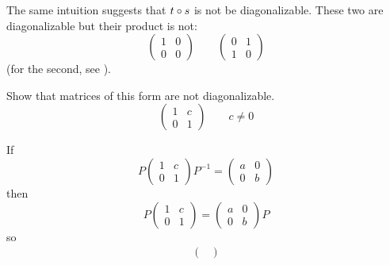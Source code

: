 \begin{exercises}
\begin{answer}
     The same intuition suggests that \( t\mathbin\circ s \) is not
     be diagonalizable.
     These two are diagonalizable but their product is not:
     \begin{equation*}
        \begin{pmatrix}
           1  &0  \\
           0  &0
        \end{pmatrix}
        \qquad
        \begin{pmatrix}
           0  &1  \\
           1  &0
        \end{pmatrix}
     \end{equation*}
     (for the second, see ).   
    \end{answer}
  \recommended \item 
    Show that matrices of this form are not diagonalizable.
    \begin{equation*}
       \begin{pmatrix}
          1  &c  \\
          0  &1
       \end{pmatrix}
       \qquad c\neq 0
    \end{equation*}
    \begin{answer}
      If
      \begin{equation*}
         P
         \begin{pmatrix}
            1  &c  \\
            0  &1
         \end{pmatrix}
         P^{-1}
         =
         \begin{pmatrix}
            a  &0  \\
            0  &b
         \end{pmatrix}
      \end{equation*}
      then
      \begin{equation*}
         P
         \begin{pmatrix}
            1  &c  \\
            0  &1
         \end{pmatrix}
         =
         \begin{pmatrix}
            a  &0  \\
            0  &b
         \end{pmatrix}
         P
      \end{equation*}
      so
      \begin{align*}
         \begin{pmatrix}

\end{pmatrix}
\end{align*}
\end{answer}
\end{exercises}
